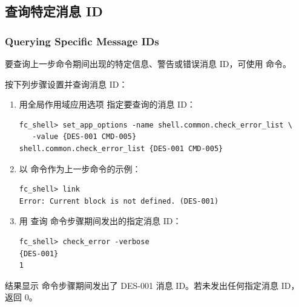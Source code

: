 \subsection{查询特定消息 ID}
\subsubsection*{Querying Specific Message IDs}

要查询上一步命令期间出现的特定信息、警告或错误消息 ID，可使用  命令。

按下列步骤设置并查询消息 ID：
\begin{enumerate}
  \item 用全局作用域应用选项  指定要查询的消息 ID：
\begin{lstlisting}
fc_shell> set_app_options -name shell.common.check_error_list \
   -value {DES-001 CMD-005}
shell.common.check_error_list {DES-001 CMD-005}
\end{lstlisting}
  \item 以  命令作为上一步命令的示例：
\begin{lstlisting}
fc_shell> link
Error: Current block is not defined. (DES-001)
\end{lstlisting}
  \item 用  查询  命令步骤期间发出的指定消息 ID：
\begin{lstlisting}
fc_shell> check_error -verbose
{DES-001}
1
\end{lstlisting}
\end{enumerate}

结果显示  命令步骤期间发出了 DES-001 消息 ID。若未发出任何指定消息 ID， 返回 0。
